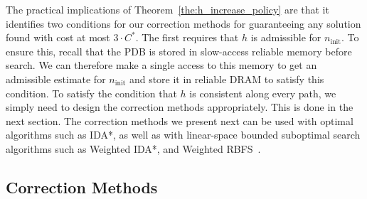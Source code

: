 \documentclass{article}
\begin{document}
The practical implications of Theorem~\ref{the:h_increase_policy} are that it identifies two conditions for our correction methods for guaranteeing any solution found with cost at most $3 \cdot C^*$. The first requires that $h$ is admissible for $n_{\mathrm{init}}$. To ensure this, recall that the PDB is stored in slow-access reliable memory before search.
We can therefore make a single access to this memory to get an admissible estimate for $n_{\mathrm{init}}$ and store it in reliable DRAM to satisfy this condition. 
To satisfy the condition that $h$ is consistent along every path, we simply need to design the correction methods appropriately. This is done in the next section. 
The correction methods we present next can be used with optimal algorithms such as IDA*, as well as with 
linear-space bounded suboptimal search algorithms such as Weighted IDA*, and Weighted RBFS~\cite{Korf1992}. %









\subsection{Correction Methods}



\end{document}

